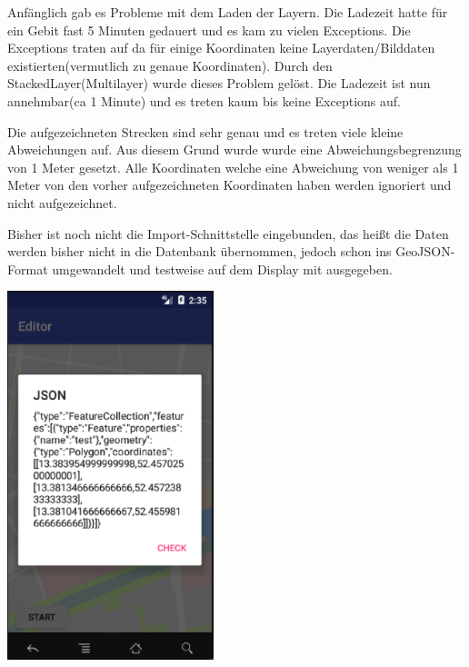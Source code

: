 Anfänglich gab es Probleme mit dem Laden der Layern. Die Ladezeit hatte für ein Gebit fast 5 Minuten gedauert und es kam zu vielen Exceptions. Die Exceptions traten auf da für einige Koordinaten keine Layerdaten/Bilddaten existierten(vermutlich zu genaue Koordinaten). Durch den StackedLayer(Multilayer) wurde dieses Problem gelöst. Die Ladezeit ist nun annehmbar(ca 1 Minute) und es treten kaum bis keine Exceptions auf.

Die aufgezeichneten Strecken sind sehr genau und es treten viele kleine Abweichungen auf. Aus diesem Grund wurde wurde eine Abweichungsbegrenzung von 1 Meter gesetzt. Alle Koordinaten welche eine Abweichung von weniger als 1 Meter von den vorher aufgezeichneten Koordinaten haben werden ignoriert und nicht aufgezeichnet.

Bisher ist noch nicht die Import-Schnittstelle eingebunden, das heißt die Daten werden bisher nicht in die Datenbank übernommen, jedoch schon ins GeoJSON-Format umgewandelt und testweise auf dem Display mit ausgegeben.

\includegraphics[width=0.45\textwidth]{AndroidEditorJSON}
